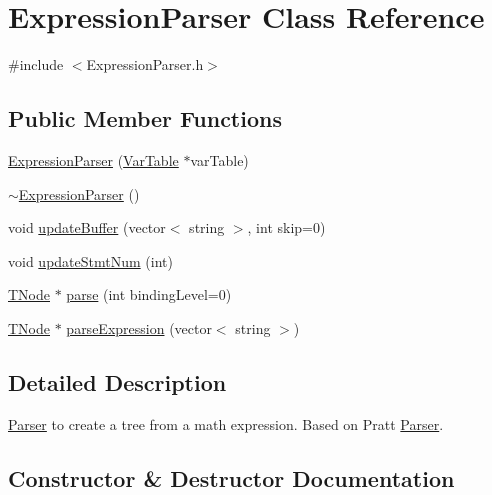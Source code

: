 \hypertarget{class_expression_parser}{}\section{Expression\+Parser Class Reference}
\label{class_expression_parser}


{\ttfamily \#include $<$Expression\+Parser.\+h$>$}

\subsection*{Public Member Functions}
\begin{DoxyCompactItemize}
\item 
\hyperlink{class_expression_parser_a70117d42814cea52435d25644246aaf0}{Expression\+Parser} (\hyperlink{class_var_table}{Var\+Table} $\ast$var\+Table)
\item 
\hyperlink{class_expression_parser_a12a5380920220c77bc102728625bc64f}{$\sim$\+Expression\+Parser} ()
\item 
void \hyperlink{class_expression_parser_ab41d2f89de4b1b03200ec1e599eb7805}{update\+Buffer} (vector$<$ string $>$, int skip=0)
\item 
void \hyperlink{class_expression_parser_acf2f40b1bf8182c5238f141779afd354}{update\+Stmt\+Num} (int)
\item 
\hyperlink{class_t_node}{T\+Node} $\ast$ \hyperlink{class_expression_parser_ab8d08e5f3891b2f4962938a236505136}{parse} (int binding\+Level=0)
\item 
\hyperlink{class_t_node}{T\+Node} $\ast$ \hyperlink{class_expression_parser_a030aa282ff031de607fe37e354204ee0}{parse\+Expression} (vector$<$ string $>$)
\end{DoxyCompactItemize}


\subsection{Detailed Description}
\hyperlink{namespace_parser}{Parser} to create a tree from a math expression. Based on Pratt \hyperlink{namespace_parser}{Parser}. 

\subsection{Constructor \& Destructor Documentation}
\hypertarget{class_expression_parser_a70117d42814cea52435d25644246aaf0}{}
